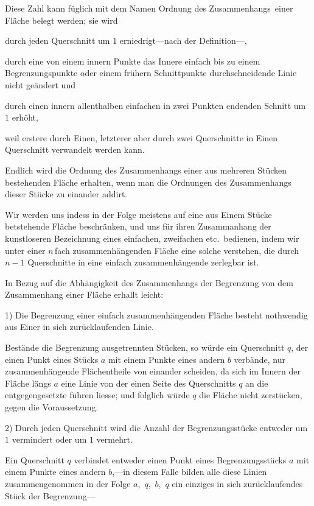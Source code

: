 \documentclass[a4paper,12pt]{article}
\begin{document}
Diese Zahl kann f\"{u}glich mit dem Namen \glqq Ordnung des
Zusammenhangs\grqq\ einer Fl\"{a}che belegt werden; sie wird

durch jeden Querschnitt um $1$ erniedrigt---nach der
Definition---,

durch eine von einem innern Punkte das Innere einfach bis zu
einem Begrenzungspunkte oder einem fr\"{u}hern Schnittpunkte
durchschneidende Linie nicht ge\"{a}ndert und

durch einen innern allenthalben einfachen in zwei Punkten
endenden Schnitt um $1$ erh\"{o}ht,

weil erstere durch Einen, letzterer aber durch zwei Querschnitte
in Einen Querschnitt verwandelt werden kann.

Endlich wird die Ordnung des Zusammenhangs einer aus mehreren
St\"{u}cken bestehenden Fl\"{a}che erhalten, wenn man die
Ordnungen des Zusammenhangs dieser St\"{u}cke zu einander addirt.

Wir werden uns indess in der Folge meistens auf eine aus Einem
St\"{u}cke betstehende Fl\"{a}che beschr\"{a}nken, und uns
f\"{u}r ihren Zusammanhang der kunstloseren Bezeichnung eines
einfachen, zweifachen etc.\ bedienen, indem wir unter einer
$n \,$\-fach zusammenh\"{a}ngenden Fl\"{a}che eine solche
verstehen, die durch $n - 1$ Querschnitte in eine einfach
zusammenh\"{a}ngende zerlegbar ist.

In Bezug auf die Abh\"{a}ngigkeit des Zusammenhangs der
Begrenzung von dem Zusammenhang einer Fl\"{a}che erhallt leicht:

1)  Die Begrenzung einer einfach zusammenh\"{a}ngenden Fl\"{a}che
besteht noth\-wendig aus Einer in sich zur\"{u}cklaufenden Linie.

Best\"{a}nde die Begrenzung ausgetrennten St\"{u}cken, so
w\"{u}rde ein Querschnitt $q$, der einen Punkt eines St\"{u}cks
$a$ mit einem Punkte eines andern $b$ verb\"{a}nde, nur
zusammenh\"{a}ngende Fl\"{a}chentheile von einander scheiden, da
sich im Innern der Fl\"{a}che l\"{a}ngs $a$ eine Linie von der
einen Seite des Querschnitts $q$ an die entgegengesetzte
f\"{u}hren liesse; und folglich w\"{u}rde $q$ die Fl\"{a}che
nicht zerst\"{u}cken, gegen die Voraussetzung.

2)  Durch jeden Querschnitt wird die Anzahl der
Begrenzungsst\"{u}cke entweder um $1$ vermindert oder um $1$
vermehrt.

Ein Querschnitt $q$ verbindet entweder einen Punkt eines
Begrenzungsst\"{u}cks $a$ mit einem Punkte eines andern $b$,---in
diesem Falle bilden alle diese Linien zusammengenommen in der
Folge $a$,~$q$,~$b$,~$q$ ein einziges in sich zur\"{u}cklaufendes
St\"{u}ck der Begrenzung---
\end{document}
